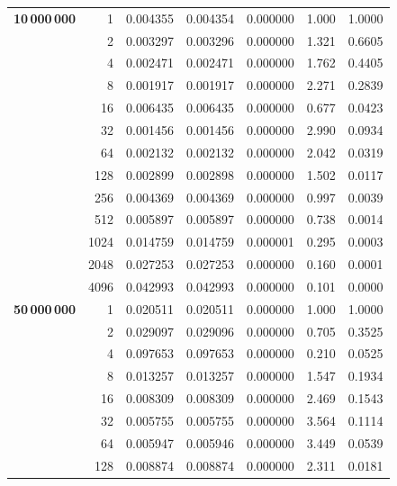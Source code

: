 \documentclass[a4paper,11pt]{article}
\begin{document}
\begin{center}
\begin{longtable}{crccccc}
    \textbf{10\,000\,000} & 1    & 0.004355 & 0.004354 & 0.000000 & 1.000  & 1.0000 \\
                       & 2    & 0.003297 & 0.003296 & 0.000000 & 1.321  & 0.6605 \\
                       & 4    & 0.002471 & 0.002471 & 0.000000 & 1.762  & 0.4405 \\
                       & 8    & 0.001917 & 0.001917 & 0.000000 & 2.271  & 0.2839 \\
                       & 16   & 0.006435 & 0.006435 & 0.000000 & 0.677  & 0.0423 \\
                       & 32   & 0.001456 & 0.001456 & 0.000000 & 2.990  & 0.0934 \\
                       & 64   & 0.002132 & 0.002132 & 0.000000 & 2.042  & 0.0319 \\
                       & 128  & 0.002899 & 0.002898 & 0.000000 & 1.502  & 0.0117 \\
                       & 256  & 0.004369 & 0.004369 & 0.000000 & 0.997  & 0.0039 \\
                       & 512  & 0.005897 & 0.005897 & 0.000000 & 0.738  & 0.0014 \\
                       & 1024 & 0.014759 & 0.014759 & 0.000001 & 0.295  & 0.0003 \\
                       & 2048 & 0.027253 & 0.027253 & 0.000000 & 0.160  & 0.0001 \\
                       & 4096 & 0.042993 & 0.042993 & 0.000000 & 0.101  & 0.0000 \\
    \midrule
    \textbf{50\,000\,000} & 1    & 0.020511 & 0.020511 & 0.000000 & 1.000  & 1.0000 \\
                       & 2    & 0.029097 & 0.029096 & 0.000000 & 0.705  & 0.3525 \\
                       & 4    & 0.097653 & 0.097653 & 0.000000 & 0.210  & 0.0525 \\
                       & 8    & 0.013257 & 0.013257 & 0.000000 & 1.547  & 0.1934 \\
                       & 16   & 0.008309 & 0.008309 & 0.000000 & 2.469  & 0.1543 \\
                       & 32   & 0.005755 & 0.005755 & 0.000000 & 3.564  & 0.1114 \\
                       & 64   & 0.005947 & 0.005946 & 0.000000 & 3.449  & 0.0539 \\
                       & 128  & 0.008874 & 0.008874 & 0.000000 & 2.311  & 0.0181 \\

\end{longtable}
\end{center}
\end{document}
